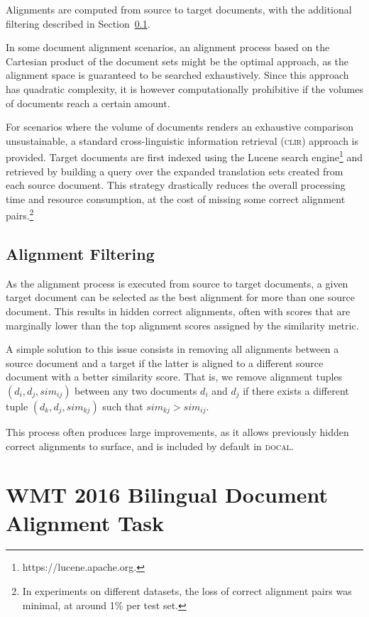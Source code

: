 \documentclass[11pt]{article}
\begin{document}
Alignments are computed from source to target documents, with the additional filtering described in Section~\ref{alfilt}.

In some document alignment scenarios, an alignment process based on the Cartesian product of the document sets might be the optimal approach, as the alignment space is guaranteed to be searched exhaustively. Since this approach has quadratic complexity, it is however computationally prohibitive if the volumes of documents reach a certain amount. 

For scenarios where the volume of documents renders an exhaustive comparison unsustainable, a standard cross-linguistic information retrieval (\textsc{clir}) approach is provided. Target documents are first indexed using the Lucene search engine\footnote{https://lucene.apache.org.} and retrieved by building a query over the expanded translation sets created from each source document. This strategy drastically reduces the overall processing time and resource consumption, at the cost of missing some correct alignment pairs.\footnote{In experiments on different datasets, the loss of correct alignment pairs was minimal, at around 1\% per test set.}

\subsection{Alignment Filtering}
\label{alfilt}

As the alignment process is executed from source to target documents, a given target document can be selected as the best alignment for more than one source document. This results in hidden correct alignments, often with scores that are marginally lower than the top alignment scores assigned by the similarity metric. 

A simple solution to this issue consists in removing all alignments between a source document and a target if the latter is aligned to a different source document with a better similarity score. That is, we remove alignment tuples $(d_i, d_j, sim_{ij})$ between any two documents $d_i$ and $d_j$ if there exists a different tuple $(d_k, d_j, sim_{kj})$ such that $sim_{kj} > sim_{ij}$.

This process often produces large improvements, as it allows previously hidden correct alignments to surface, and is included by default in \textsc{docal}.

\section{WMT 2016 Bilingual Document Alignment Task}
\end{document}
